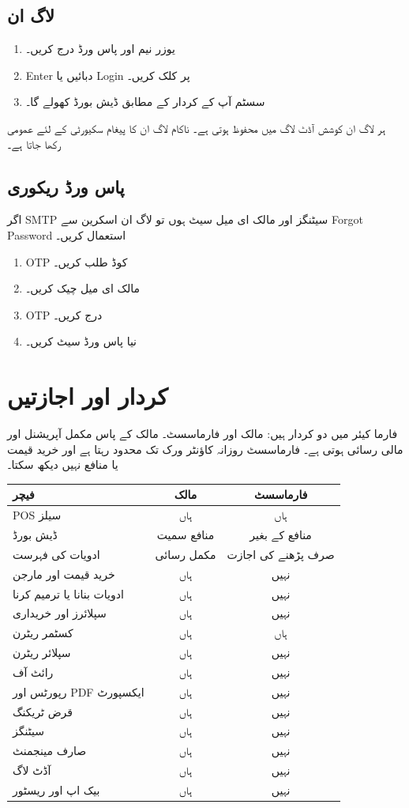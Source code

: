 \documentclass[12pt,a4paper]{article}
\begin{document}
\subsection{لاگ ان}
\begin{enumerate}
  \item یوزر نیم اور پاس ورڈ درج کریں۔
  \item Enter دبائیں یا Login پر کلک کریں۔
  \item سسٹم آپ کے کردار کے مطابق ڈیش بورڈ کھولے گا۔
\end{enumerate}
ہر لاگ ان کوشش آڈٹ لاگ میں محفوظ ہوتی ہے۔ ناکام لاگ ان کا پیغام سکیورٹی کے لئے عمومی رکھا جاتا ہے۔

\subsection{پاس ورڈ ریکوری}
اگر SMTP سیٹنگز اور مالک ای میل سیٹ ہوں تو لاگ ان اسکرین سے Forgot Password استعمال کریں۔
\begin{enumerate}
  \item OTP کوڈ طلب کریں۔
  \item مالک ای میل چیک کریں۔
  \item OTP درج کریں۔
  \item نیا پاس ورڈ سیٹ کریں۔
\end{enumerate}

\section{کردار اور اجازتیں}
فارما کیئر میں دو کردار ہیں: مالک اور فارماسسٹ۔ مالک کے پاس مکمل آپریشنل اور مالی رسائی ہوتی ہے۔ فارماسسٹ روزانہ کاؤنٹر ورک تک محدود رہتا ہے اور خرید قیمت یا منافع نہیں دیکھ سکتا۔

\begin{longtable}{>{\raggedright\arraybackslash}p{6cm}cc}
\toprule
\textbf{فیچر} & \textbf{مالک} & \textbf{فارماسسٹ} \\
\midrule
POS سیلز & ہاں & ہاں \\
ڈیش بورڈ & منافع سمیت & منافع کے بغیر \\
ادویات کی فہرست & مکمل رسائی & صرف پڑھنے کی اجازت \\
خرید قیمت اور مارجن & ہاں & نہیں \\
ادویات بنانا یا ترمیم کرنا & ہاں & نہیں \\
سپلائرز اور خریداری & ہاں & نہیں \\
کسٹمر ریٹرن & ہاں & ہاں \\
سپلائر ریٹرن & ہاں & نہیں \\
رائٹ آف & ہاں & نہیں \\
رپورٹس اور PDF ایکسپورٹ & ہاں & نہیں \\
قرض ٹریکنگ & ہاں & نہیں \\
سیٹنگز & ہاں & نہیں \\
صارف مینجمنٹ & ہاں & نہیں \\
آڈٹ لاگ & ہاں & نہیں \\
بیک اپ اور ریسٹور & ہاں & نہیں \\
\bottomrule
\end{longtable}
\end{document}
